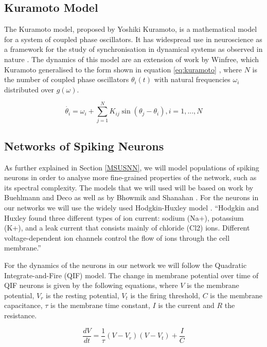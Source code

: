 \documentclass[a4paper,11pt]{article}
\begin{document}
\subsection{Kuramoto Model}
\label{KuramotoModel}

The Kuramoto model, proposed by Yoshiki Kuramoto, is a mathematical model for a system of coupled phase oscillators. It has widespread use in neuroscience as a framework for the study of synchronisation in dynamical systems as observed in nature \cite{Cumin2007}. The dynamics of this model are an extension of work by Winfree, which Kuramoto generalised to the form shown in equation \ref{eq:kuramoto} \cite{Strogatz2000}, where $N$ is the number of coupled phase oscillators $\theta_{i}(t)$ with natural frequencies $\omega_{i}$ distributed over $g(\omega)$.

\begin{equation} \label{eq:kuramoto}
\dot{\theta_i} = \omega_i + \sum_{j=1}^{N} K_{ij} \sin(\theta_j - \theta_i), i = 1, ..., N
\end{equation}


\subsection{Networks of Spiking Neurons}

As further explained in Section \ref{MSUSNN}, we will model populations of spiking neurons in order to analyse more fine-grained properties of the network, such as its spectral complexity. The models that we will used will be based on work by Buehlmann and Deco \cite{Buehlmann2010} as well as by Bhowmik and Shanahan \cite{Bhowmik2013}. For the neurons in our networks we will use the widely used Hodgkin-Huxley model \cite{Hodgkin1952}. ``Hodgkin and Huxley found three different types of ion current: sodium (Na+), potassium (K+), and a leak current that consists mainly of chloride (Cl2) ions. Different voltage-dependent ion channels control the flow of ions through the cell membrane.'' \cite{Bhowmik2013}

For the dynamics of the neurons in our network we will follow the Quadratic Integrate-and-Fire (QIF) model. The change in membrane potential over time of QIF neurons is given by the following equations, where $V$ is the membrane potential, $V_r$ is the resting potential, $V_t$ is the firing threshold, $C$ is the membrane capacitance, $\tau$ is the membrane time  constant, $I$ is the current and $R$ the resistance.

\begin{equation} \label{eq:qif}
\frac{dV}{dt} = \frac{1}{\tau}(V - V_ r)(V-V_t) +  \frac{I}{C}
\end{equation}
\end{document}
